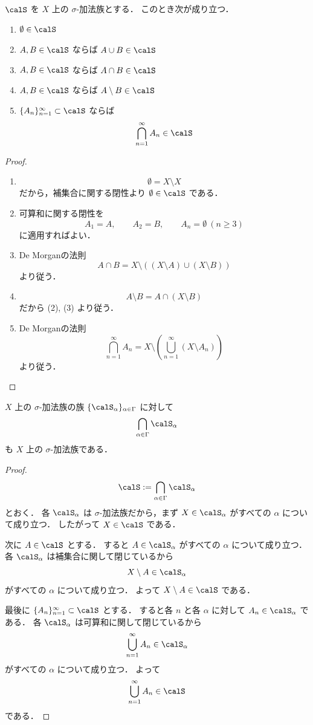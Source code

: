 \begin{proposition}[基本性質]
$\calS$ を $X$ 上の $\sigma$-加法族とする．
このとき次が成り立つ．
\begin{enumerate}
    \item $\emptyset \in \calS$
    \item $A,B \in \calS$ ならば $A \cup B \in \calS$
    \item $A,B \in \calS$ ならば $A \cap B \in \calS$
    \item $A,B \in \calS$ ならば $A \setminus B \in \calS$
    \item $\{A_n\}_{n=1}^{\infty} \subset \calS$ ならば
    \[
    \bigcap_{n=1}^{\infty} A_n \in \calS
    \]
\end{enumerate}
\end{proposition}
\begin{proof}
\begin{enumerate}
    \item
    \[
    \emptyset = X \setminus X
    \]
    だから，補集合に関する閉性より $\emptyset \in \calS$ である．

    \item 可算和に関する閉性を
    \[
    A_1=A,\qquad A_2=B,\qquad A_n=\emptyset\ (n\ge 3)
    \]
    に適用すればよい．

    \item De Morganの法則
    \[
    A \cap B = X \setminus ((X \setminus A)\cup(X \setminus B))
    \]
    より従う．

    \item
    \[
    A\setminus B=A\cap(X\setminus B)
    \]
    だから (2), (3) より従う．

    \item De Morganの法則
    \[
    \bigcap_{n=1}^{\infty}A_n
    =
    X\setminus\left(\bigcup_{n=1}^{\infty}(X\setminus A_n)\right)
    \]
    より従う．
\end{enumerate}
\end{proof}

\begin{proposition}[共通部分]
$X$ 上の $\sigma$-加法族の族 $\{\calS_\alpha\}_{\alpha \in \Gamma}$ に対して
\[
\bigcap_{\alpha \in \Gamma}\calS_\alpha
\]
も $X$ 上の $\sigma$-加法族である．
\end{proposition}
\begin{proof}
\[
\calS:=\bigcap_{\alpha \in \Gamma}\calS_\alpha
\]
とおく．
各 $\calS_\alpha$ は $\sigma$-加法族だから，まず $X \in \calS_\alpha$ がすべての $\alpha$ について成り立つ．
したがって $X \in \calS$ である．

次に $A \in \calS$ とする．
すると $A \in \calS_\alpha$ がすべての $\alpha$ について成り立つ．
各 $\calS_\alpha$ は補集合に関して閉じているから
\[
X\setminus A \in \calS_\alpha
\]
がすべての $\alpha$ について成り立つ．
よって $X\setminus A \in \calS$ である．

最後に $\{A_n\}_{n=1}^{\infty}\subset \calS$ とする．
すると各 $n$ と各 $\alpha$ に対して $A_n \in \calS_\alpha$ である．
各 $\calS_\alpha$ は可算和に関して閉じているから
\[
\bigcup_{n=1}^{\infty}A_n \in \calS_\alpha
\]
がすべての $\alpha$ について成り立つ．
よって
\[
\bigcup_{n=1}^{\infty}A_n \in \calS
\]
である．
\end{proof}

